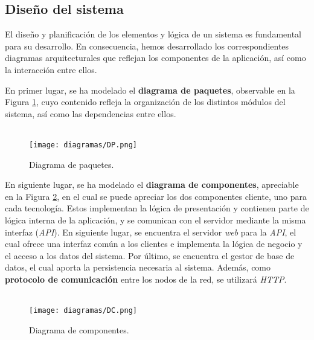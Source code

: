 \documentclass[11pt, a4paper, titlepage]{article}
\begin{document}
\newpage

\subsection{Diseño del sistema}

El diseño y planificación de los elementos y lógica de un sistema es fundamental para su desarrollo. En consecuencia, hemos desarrollado los correspondientes diagramas arquitecturales que reflejan los componentes de la aplicación, así como la interacción entre ellos. \newline

En primer lugar, se ha modelado el \textbf{diagrama de paquetes}, observable en la Figura \ref{ref:paquetes}, cuyo contenido refleja la organización de los distintos módulos del sistema, así como las dependencias entre ellos. \\ \\

\begin{figure}[!h]
    \centering
    \texttt{[image: diagramas/DP.png]}
    \caption{Diagrama de paquetes.}
    \label{ref:paquetes}
\end{figure}

\newpage

En siguiente lugar, se ha modelado el \textbf{diagrama de componentes}, apreciable en la Figura \ref{ref:componentes}, en el cual se puede apreciar los dos componentes cliente, uno para cada tecnología. Estos implementan la lógica de presentación y contienen parte de lógica interna de la aplicación, y se comunican con el servidor mediante la misma interfaz (\textit{API}). En siguiente lugar, se encuentra el servidor \textit{web} para la \textit{API}, el cual ofrece una interfaz común a los clientes e implementa la lógica de negocio y el acceso a los datos del sistema. Por último, se encuentra el gestor de base de datos, el cual aporta la persistencia necesaria al sistema. Además, como \textbf{protocolo de comunicación} entre los nodos de la red, se utilizará \textit{HTTP}. \\ \\

\begin{figure}[!h]
    \centering
    \texttt{[image: diagramas/DC.png]}
    \caption{Diagrama de componentes.}
    \label{ref:componentes}
\end{figure}

\newpage
\end{document}
